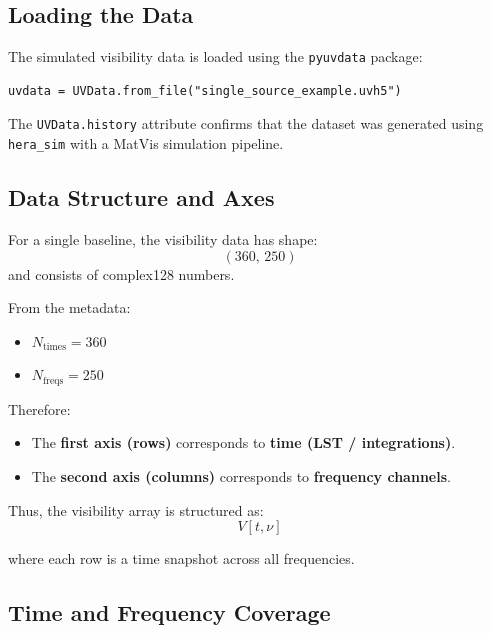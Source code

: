 \documentclass{article}
\begin{document}
\subsection{Loading the Data}

The simulated visibility data is loaded using the \texttt{pyuvdata} package:

\begin{verbatim}
uvdata = UVData.from_file("single_source_example.uvh5")
\end{verbatim}

The \texttt{UVData.history} attribute confirms that the dataset was generated using \texttt{hera\_sim} with a MatVis simulation pipeline.

\subsection{Data Structure and Axes}

For a single baseline, the visibility data has shape:
\begin{equation}
(360,\, 250)
\end{equation}
and consists of complex128 numbers.

From the metadata:

\begin{itemize}
    \item $N_{\mathrm{times}} = 360$
    \item $N_{\mathrm{freqs}} = 250$
\end{itemize}

Therefore:

\begin{itemize}
    \item The \textbf{first axis (rows)} corresponds to \textbf{time (LST / integrations)}.
    \item The \textbf{second axis (columns)} corresponds to \textbf{frequency channels}.
\end{itemize}

Thus, the visibility array is structured as:
\begin{equation}
V[t, \nu]
\end{equation}

where each row is a time snapshot across all frequencies.

\subsection{Time and Frequency Coverage}
\end{document}
